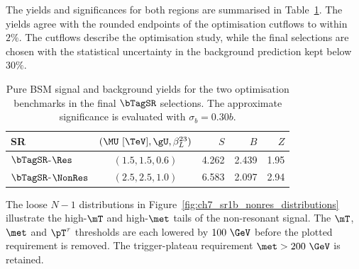 The yields and significances for both regions are summarised in Table~\ref{tab:ch7_prefit_yields}.
The yields agree with the rounded endpoints of the optimisation cutflows to within $2\%$.
The cutflows describe the optimisation study, while the final selections are chosen with the statistical uncertainty in the background prediction kept below $30\%$.

\begin{table}[htbp]
    \centering
    \small
    \caption{Pure BSM signal and background yields for the two optimisation benchmarks in the final $\bTagSR$ selections. The approximate significance is evaluated with $\sigma_b=0.30b$.}
    \label{tab:ch7_prefit_yields}
    \begin{tabular}{lcrrr}
        \toprule
        SR & $(\MU~[\TeV],\gU,\beta_L^{23})$ & $S$ & $B$ & $Z$ \\
        \midrule
        $\bTagSR$-$\Res$ & $(1.5,1.5,0.6)$ & 4.262 & 2.439 & 1.95 \\
        $\bTagSR$-$\NonRes$ & $(2.5,2.5,1.0)$ & 6.583 & 2.097 & 2.94 \\
        \bottomrule
    \end{tabular}
\end{table}

The loose $N-1$ distributions in Figure~\ref{fig:ch7_sr1b_nonres_distributions} illustrate the high-$\mT$ and high-$\met$ tails of the non-resonant signal.
The $\mT$, $\met$ and $\pT^\tau$ thresholds are each lowered by $100~\GeV$ before the plotted requirement is removed.
The trigger-plateau requirement $\met>200~\GeV$ is retained.


